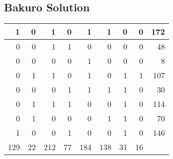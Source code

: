\documentclass[]{article}
\begin{document}
 \subsection{Bakuro Solution} 
\begin{tabular}{rrrrrrrrr}
\hline
   1 &  0 &   1 &  0 &   1 &   1 &  0 &  0 & 172 \\ \hline
   0 &  0 &   1 &  1 &   0 &   0 &  0 &  0 &  48 \\ \hline
   0 &  0 &   0 &  0 &   1 &   0 &  0 &  0 &   8 \\ \hline
   0 &  1 &   1 &  0 &   1 &   0 &  1 &  1 & 107 \\ \hline
   0 &  0 &   0 &  1 &   1 &   1 &  1 &  0 &  30 \\ \hline
   0 &  1 &   1 &  1 &   0 &   0 &  1 &  0 & 114 \\ \hline
   0 &  1 &   0 &  0 &   0 &   1 &  1 &  0 &  70 \\ \hline
   1 &  0 &   0 &  1 &   0 &   0 &  1 &  0 & 146 \\ \hline
 129 & 22 & 212 & 77 & 184 & 138 & 31 & 16 &     \\ \hline
\hline
\end{tabular}\newpage
 
\end{document}
